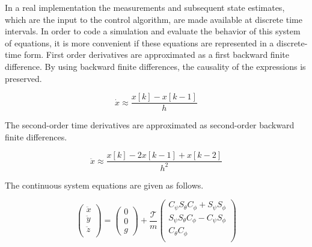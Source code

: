 In a real implementation the measurements and subsequent state estimates, which are the input to the control algorithm, are made available at discrete time intervals. In order to code a simulation and evaluate the behavior of this system of equations, it is more convenient if these equations are represented in a discrete-time form. First order derivatives are approximated as a first backward finite difference. By using backward finite differences, the causality of the expressions is preserved.

\begin{equation}
\dot x \approx \frac{x[k] - x[k-1]}{h}
\end{equation}

The second-order time derivatives are approximated as second-order backward finite differences.

\begin{equation}
\ddot x \approx \frac{x[k] -2 x[k-1] + x[k-2]}{h^2}
\end{equation}

The continuous system equations are given as follows.

\begin{equation}
    \left(
        \begin{array}{c}
           \ddot{x}\\
           \ddot{y}\\
           \ddot{z}\\
        \end{array}
    \right)
    = \left(
       \begin{array}{c}
        0\\
        0\\
        g
      \end{array}
    \right)
    +\frac{\mathcal{T}}{m}
     \left(
        \begin{array}{c}
             C_{\psi}S_{\theta}C_{\phi} + S_{\psi}S_{\phi} \\
             S_{\psi}S_{\theta}C_{\phi} - C_{\psi}S_{\phi} \\
             C_{\theta} C_{\phi} \\
        \end{array}
    \right)
\end{equation}


